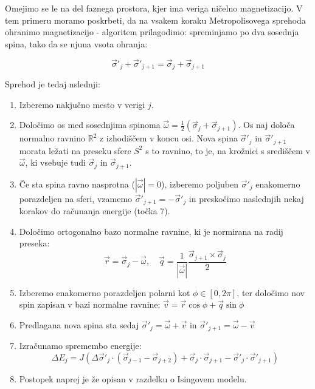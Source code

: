 \documentclass[a4paper]{article}
\newcommand{\half}{\frac{1}{2}}
\newcommand{\s}{\sigma}
\newcommand{\vs}{\vec{\s}}
\newcommand{\vr}{\vec{r}}
\newcommand{\vq}{\vec{q}}
\newcommand{\vv}{\vec{v}}
\newcommand{\vo}{\vec{\omega}}
\newcommand{\D}{\Delta}
\begin{document}
    Omejimo se le na del faznega prostora, kjer ima veriga ničelno magnetizacijo.
    V tem primeru moramo poskrbeti, da na vsakem koraku Metropolisovega sprehoda ohranimo magnetizacijo - algoritem
    prilagodimo: spreminjamo po dva sosednja spina, tako da se njuna vsota ohranja:

    \begin{equation}\label{eq13}
        \vs'_j + \vs'_{j+1} = \vs_j + \vs_{j+1}
    \end{equation}

    Sprehod je tedaj nslednji:

    \begin{enumerate}
        \item Izberemo nakjučno mesto v verigi $j$.
        \item Določimo os med sosednjima spinoma $\vo = \half (\vs_j + \vs_{j+1})$.
        Os naj določa normalno ravnino $\mathbb{R}^2$ z izhodiščem v koncu osi.
        Nova spina $\vs'_{j}$ in $\vs'_{j+1}$ morata ležati na preseku sfere $S^2$ s to ravnino, to je, na krožnici
        s središčem v $\vo$, ki vsebuje tudi $\vs_j$ in $\vs_{j+1}$.
        \item Če sta spina ravno nasprotna ($|\vo| = 0$), izberemo poljuben $\vs'_j$ enakomerno porazdeljen na sferi,
        vzamemo $\vs'_{j+1} = -\vs'_j$ in preskočimo naslednjih nekaj korakov do računanja energije (točka 7).
        \item Določimo ortogonalno bazo normalne ravnine, ki je normirana na radij preseka:
        \begin{equation}\label{eq14}
            \vr = \vs_{j} - \vo, \quad \vq = \frac{1}{|\vo|} \frac{\vs_{j+1} \times \vs_{j}}{2}
        \end{equation}
        \item Izberemo enakomerno porazdeljen polarni kot $\phi \in [0, 2\pi]$, ter določimo nov spin zapisan v bazi
        normalne ravnine: $\vv = \vr \cos{\phi} + \vq \sin{\phi}$
        \item Predlagana nova spina sta sedaj $\vs'_{j} = \vo + \vv$ in $\vs'_{j+1} = \vo - \vv$
        \item Izračunamo spremembo energije:
        \begin{equation}\label{eq15}
            \D E_j = J(\D \vs'_{j} \cdot (\vs_{j-1} - \vs_{j+2}) + \vs_j \cdot \vs_{j+1} - \vs'_j \cdot \vs'_{j+1})
        \end{equation}
        \item Postopek naprej je že opisan v razdelku o Isingovem modelu.
    \end{enumerate}
\end{document}
